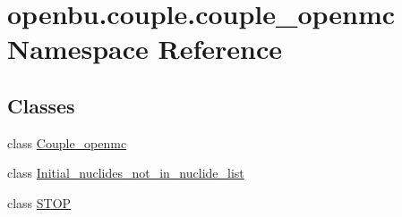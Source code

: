 \hypertarget{namespaceopenbu_1_1couple_1_1couple__openmc}{}\section{openbu.\+couple.\+couple\+\_\+openmc Namespace Reference}
\label{namespaceopenbu_1_1couple_1_1couple__openmc}
\subsection*{Classes}
\begin{DoxyCompactItemize}
\item 
class \mbox{\hyperlink{classopenbu_1_1couple_1_1couple__openmc_1_1_couple__openmc}{Couple\+\_\+openmc}}
\item 
class \mbox{\hyperlink{classopenbu_1_1couple_1_1couple__openmc_1_1_initial__nuclides__not__in__nuclide__list}{Initial\+\_\+nuclides\+\_\+not\+\_\+in\+\_\+nuclide\+\_\+list}}
\item 
class \mbox{\hyperlink{classopenbu_1_1couple_1_1couple__openmc_1_1_s_t_o_p}{S\+T\+OP}}
\end{DoxyCompactItemize}
